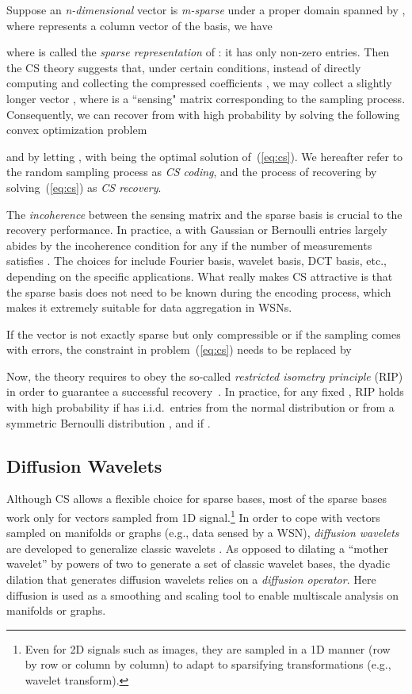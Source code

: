 \documentclass[conference]{IEEEtran}
\begin{document}
    Suppose an \textit{n-dimensional} vector  is \textit{m-sparse} under a proper domain spanned by , where  represents a column vector of the basis, we have
    
where  is called the \textit{sparse representation} of : it has only  non-zero entries. Then the CS theory suggests that, under certain conditions, instead of directly computing and collecting the compressed coefficients , we may collect a slightly longer vector , where  is a  ``sensing" matrix corresponding to the sampling process. Consequently, we can recover  from  with high probability by solving the following convex optimization problem
    
and by letting , with  being the optimal solution of~(\ref{eq:cs}). We hereafter refer to the random sampling process  as \textit{CS coding}, and the process of recovering  by solving~(\ref{eq:cs}) as \textit{CS recovery}.

    The \textit{incoherence} \cite{CandesRT-TIT06} between the sensing matrix  and the sparse basis  is crucial to the recovery performance. In practice, a  with Gaussian or Bernoulli entries largely abides by the incoherence condition for any  if the number of measurements satisfies  \cite{CandesRT-TIT06}. The choices for  include Fourier basis, wavelet basis, DCT basis, etc., depending on the specific applications. What really makes CS attractive is that the sparse basis does not need to be known during the encoding process, which makes it extremely suitable for data aggregation in WSNs.

    If the vector  is not exactly sparse but only compressible or if the sampling comes with errors, the constraint in problem~(\ref{eq:cs}) needs to be replaced by
    
    Now, the theory requires  to obey the so-called \textit{restricted isometry principle} (RIP) in order to guarantee a successful recovery~\cite{Candes-SPMag08}. In practice, for any fixed , RIP holds with high probability if  has i.i.d.\ entries from the normal distribution  or from a symmetric Bernoulli distribution , and if .

  \subsection{Diffusion Wavelets} \label{sec:diffwave}
Although CS allows a flexible choice for sparse bases, most of the sparse bases work only for vectors sampled from 1D signal.\footnote{Even for 2D signals such as images, they are sampled in a 1D manner (row by row or column by column) to adapt to sparsifying transformations (e.g., wavelet transform).} In order to cope with vectors sampled on manifolds or graphs (e.g., data sensed by a WSN), \textit{diffusion wavelets} are developed to generalize classic wavelets \cite{CoifmanM-04}. As opposed to dilating a ``mother wavelet'' by powers of two to generate a set of classic wavelet bases, the dyadic dilation that generates diffusion wavelets relies on a \textit{diffusion operator}. Here diffusion is used as a smoothing and scaling tool to enable multiscale analysis on manifolds or graphs.
\end{document}

